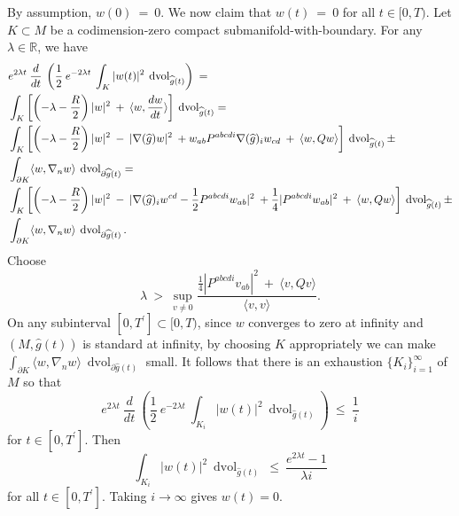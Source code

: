 \documentclass[12pt]{amsart}
\newcommand{\dvol}{\operatorname{dvol}}
\newcommand{\R}{{\mathbb R}}
\numberwithin{equation}{section}
\theoremstyle{plain}
\theoremstyle{definition}
\theoremstyle{remark}
\begin{document}
By assumption, $w(0) \: = \: 0$. We now claim that $w(t) \: = \: 0$
for all $t \in [0, T)$.
Let $K \subset M$ be a codimension-zero compact submanifold-with-boundary.
For any $\lambda \in \R$, we have
\begin{align}
& e^{2\lambda t} \: \frac{d}{dt} \: \left( \frac{1}{2} \: e^{-2\lambda t} \: 
\int_K |w(t)|^2 \: \dvol_{\widehat{g}(t)} \right) \:  = \\
& \int_K \left[ \left( -\lambda - \frac{R}{2} \right) |w|^2 \: + \:
\langle w, \frac{dw}{dt} \rangle \right] \: \dvol_{\widehat{g}(t)} = \notag \\
&
\int_K \left[ \left( -\lambda - \frac{R}{2} \right) |w|^2 \: - \:
|\nabla(\widehat{g}) w|^2 \: + 
w_{ab} P^{abcdi} \nabla(\widehat{g})_i w_{cd} \: + \: 
\langle w,  Q w \rangle \right] \: \dvol_{\widehat{g}(t)} 
\pm \notag \\
& \int_{\partial K} \langle w, \nabla_n w \rangle \: 
\dvol_{\partial \widehat{g}(t)} = \notag \\
& \int_K \left[ \left( -\lambda - \frac{R}{2} \right) |w|^2 \: - \:
|\nabla(\widehat{g})_i w^{cd} - \frac{1}{2} P^{abcdi} w_{ab}|^2 \:  
+ \frac{1}{4} |P^{abcdi} w_{ab}|^2 \: + \: 
\langle w,  Q w \rangle \right] \: \dvol_{\widehat{g}(t)} \pm \notag \\
& \int_{\partial K} \langle w, \nabla_n w \rangle 
\: \dvol_{\partial \widehat{g}(t)}. \notag
\end{align}
Choose
\begin{equation}
\lambda \: > \: \sup_{v \neq 0} \frac{
\frac{1}{4} |P^{abcdi} v_{ab}|^2 \: + \: 
\langle v,  Q v \rangle
}{\langle v, v \rangle}.
\end{equation}
On any subinterval $[0, T^\prime] \subset [0, T)$, since
$w$ converges to zero at infinity
and $(M, \widehat{g}(t))$
is standard at infinity, by choosing $K$ appropriately we can make
$\int_{\partial K} \langle w, \nabla_n w \rangle 
\: \dvol_{\partial \widehat{g}(t)}$ small.
It follows that there is an exhaustion
$\{K_i\}_{i=1}^\infty$ of $M$ so that
\begin{equation}
e^{2\lambda t} \: \frac{d}{dt} \: \left( \frac{1}{2} \: e^{-2\lambda t} \: 
\int_{K_i} |w(t)|^2 \: \dvol_{\widehat{g}(t)} \right) \: \le \:
\frac{1}{i}
\end{equation}
for $t \in [0, T^\prime]$.
Then
\begin{equation}
\int_{K_i} |w(t)|^2 \: \dvol_{\widehat{g}(t)} \: \le \: 
\frac{e^{2\lambda t}-1}{\lambda i}
\end{equation}
for all $t \in [0, T^\prime]$.
Taking $i \rightarrow \infty$ gives $w(t) = 0$.
\end{document}
